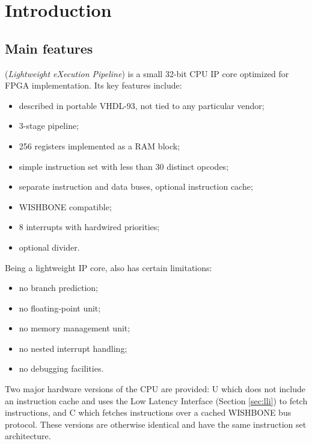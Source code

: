 \documentclass[a4paper,12pt,twoside,extrafontsizes]{memoir}
\begin{document}


\mainmatter

\chapter{Introduction}

\section{Main features}

\lxp{} (\emph{Lightweight eXecution Pipeline}) is a small 32-bit CPU IP core optimized for FPGA implementation. Its key features include:

\begin{itemize}
	\item described in portable VHDL-93, not tied to any particular vendor;
	\item 3-stage pipeline;
	\item 256 registers implemented as a RAM block;
	\item simple instruction set with less than 30 distinct opcodes;
	\item separate instruction and data buses, optional instruction cache;
	\item WISHBONE compatible;
	\item 8 interrupts with hardwired priorities;
	\item optional divider.
\end{itemize}

Being a lightweight IP core, \lxp{} also has certain limitations:

\begin{itemize}
	\item no branch prediction;
	\item no floating-point unit;
	\item no memory management unit;
	\item no nested interrupt handling;
	\item no debugging facilities.
\end{itemize}

Two major hardware versions of the CPU are provided: \lxp{}U which does not include an instruction cache and uses the Low Latency Interface (Section \ref{sec:lli}) to fetch instructions, and \lxp{}C which fetches instructions over a cached WISHBONE bus protocol. These versions are otherwise identical and have the same instruction set architecture.
\end{document}
